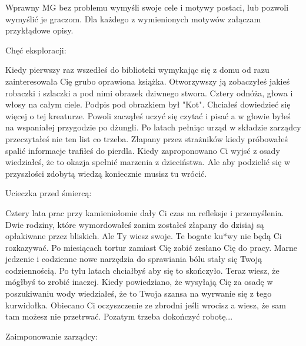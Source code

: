 \documentclass{article}
\begin{document}
    \bigskip

    Wprawny MG bez problemu wymyśli swoje cele i motywy postaci, lub pozwoli wymyślić je graczom. Dla każdego z wymienionych motywów załączam przykłądowe opisy.

    \bigskip

    Chęć eksploracji:
    \begin{tcolorbox}
        \ttfamily
        Kiedy pierwszy raz wszedłeś do biblioteki wymykając się z domu od razu zainteresowała Cię grubo oprawiona książka. Otworzywszy ją zobaczyłeś jakieś robaczki i szlaczki a pod nimi obrazek dziwnego stwora. Cztery odnóża, głowa i włosy na całym ciele. Podpis pod obrazkiem był "Kot". Chciałeś dowiedzieć się więcej o tej kreaturze. Powoli zacząłeś uczyć się czytać i pisać a w głowie byłeś na wspaniałej przygodzie po dżungli. Po latach pełniąc urząd w składzie zarządcy przeczytałeś nie ten list co trzeba. Złapany przez strażników kiedy próbowałeś spalić informacje trafiłeś do pierdla. Kiedy zaproponowano Ci wyjsć z osady wiedziałeś, że to okazja spełnić marzenia z dzieciństwa. Ale aby podzielić się w przyszłości zdobytą wiedzą koniecznie musisz tu wrócić.
    \end{tcolorbox}


    \bigskip

    Ucieczka przed śmiercą:

    \begin{tcolorbox}
        \ttfamily
        Cztery lata prac przy kamieniołomie dały Ci czas na refleksje i przemyślenia. Dwie rodziny, które wymordowałeś zanim zostałeś złapany do dzisiaj są opłakiwane przez bliskich. Ale Ty wiesz swoje. Te bogate ku*wy nie będą Ci rozkazywać. Po miesiącach tortur zamiast Cię zabić zesłano Cię do pracy. Marne jedzenie i codzienne nowe narzędzia do sprawiania bólu stały się Twoją codziennością. Po tylu latach chciałbyś aby się to skończyło. Teraz wiesz, że mógłbyś to zrobić inaczej. Kiedy powiedziano, że wysyłają Cię za osadę w poszukiwaniu wody wiedziałeś, że to Twoja szansa na wyrwanie się z tego kurwidołka. Obiecano Ci oczyszczenie ze zbrodni jeśli wrocisz a wiesz, że sam tam możesz nie przetrwać. Pozatym trzeba dokończyć robotę...
    \end{tcolorbox}

    \newpage
    \bigskip

    Zaimponowanie zarządcy:
\end{document}

